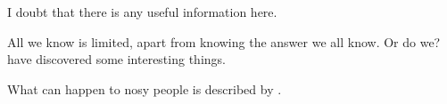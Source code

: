 \documentclass{article}
\begin{document}
I doubt that there is any useful information here.~\cite{wikibook}

All we know is limited, apart from knowing the answer we all
know. Or do we? \citeauthor{wombat2016} have discovered some interesting
things.~\autocite[compare][80]{wombat2016}

What can happen to nosy people is described by \textcite[9]{lion2010}.
\printbibliography
\end{document}
